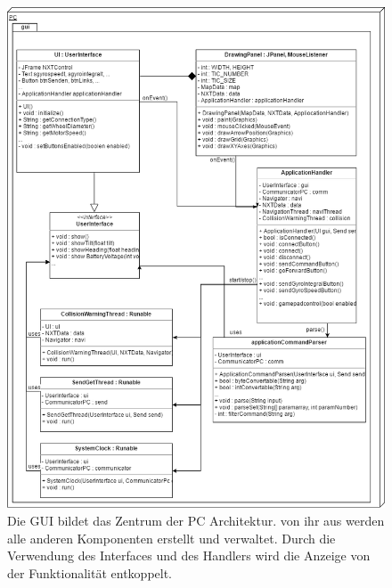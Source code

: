 \documentclass[oneside,abstractoff,a4paper]{scrartcl}
\begin{document}
\begin{figure}
	\includegraphics[width=\textwidth,height=0.85\textheight,keepaspectratio]{PCGui.png}
    \caption{Die GUI bildet das Zentrum der PC Architektur. von ihr aus werden alle anderen Komponenten erstellt und verwaltet. Durch die Verwendung des Interfaces und des Handlers wird die Anzeige von der Funktionalität entkoppelt.}
    \label{fig:GuiPC}
\end{figure}
\end{document}
